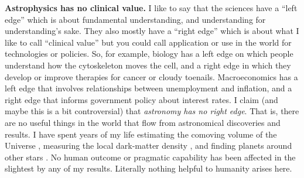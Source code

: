 \documentclass{article}
\newcommand{\paragraphskip}{\medskip}
\renewcommand{\paragraph}[1]{\par\paragraphskip\noindent\textbf{#1}}
\begin{document}
\paragraph{Astrophysics has no clinical value.}
I like to say that the sciences have a ``left edge'' which is about fundamental understanding, and understanding for understanding's sake.
They also mostly have a ``right edge'' which is about what I like to call ``clinical value'' but you could call application or use in the world for technologies or policies.
So, for example, biology has a left edge on which people understand how the cytoskeleton moves the cell, and a right edge in which they develop or improve therapies for cancer or cloudy toenails.
Macroeconomics has a left edge that involves relationships between unemployment and inflation, and a right edge that informs government policy about interest rates.
I claim (and maybe this is a bit controversial) that \emph{astronomy has no right edge}.
That is, there are no useful things in the world that flow from astronomical discoveries and results.
I have spent years of my life estimating the comoving volume of the Universe \cite{phdthesis}, measuring the local dark-matter density \cite{oti}, and finding planets around other stars \cite{singletransit}.
No human outcome or pragmatic capability has been affected in the slightest by any of my results.
Literally nothing helpful to humanity arises here.
\end{document}

